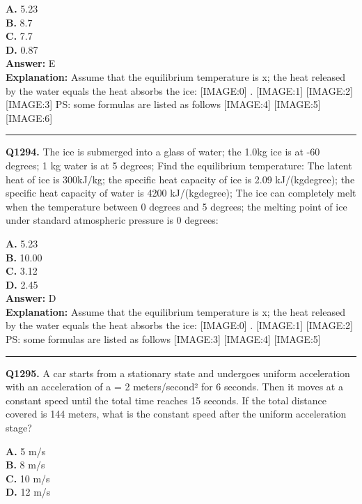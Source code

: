 \documentclass[12pt]{article}
\begin{document}
\textbf{A.} 5.23 \\
\textbf{B.} 8.7 \\
\textbf{C.} 7.7 \\
\textbf{D.} 0.87 \\

\textbf{Answer:} E \\
\textbf{Explanation:} Assume that the equilibrium temperature is x; the heat released by the water equals the heat absorbs the ice:
[IMAGE:0]
.
[IMAGE:1]
[IMAGE:2]
[IMAGE:3]
PS: some formulas are listed as follows
[IMAGE:4]
[IMAGE:5]
[IMAGE:6]

\hrule
\vspace{1em}


\noindent
\textbf{Q1294.} The ice is submerged into a glass of water; the 1.0kg ice is at -60 degrees; 1 kg water is at 5 degrees; Find the equilibrium temperature: The latent heat of ice is 300kJ/kg; the specific heat capacity of ice is 2.09 kJ/(kg\cdot degree); the specific heat capacity of water is 4200 kJ/(kg\cdot degree); The ice can completely melt when the temperature between 0 degrees and 5 degrees; the melting point of ice under standard atmospheric pressure is 0 degrees:



\textbf{A.} 5.23 \\
\textbf{B.} 10.00 \\
\textbf{C.} 3.12 \\
\textbf{D.} 2.45 \\

\textbf{Answer:} D \\
\textbf{Explanation:} Assume that the equilibrium temperature is x; the heat released by the water equals the heat absorbs the ice:
[IMAGE:0]
.
[IMAGE:1]
[IMAGE:2]
PS: some formulas are listed as follows
[IMAGE:3]
[IMAGE:4]
[IMAGE:5]

\hrule
\vspace{1em}


\noindent
\textbf{Q1295.} A car starts from a stationary state and undergoes uniform acceleration with an acceleration of a = 2 meters/second² for 6 seconds. Then it moves at a constant speed until the total time reaches 15 seconds. If the total distance covered is 144 meters, what is the constant speed after the uniform acceleration stage?



\textbf{A.} 5 m/s \\
\textbf{B.} 8 m/s \\
\textbf{C.} 10 m/s \\
\textbf{D.} 12 m/s \\
\end{document}
